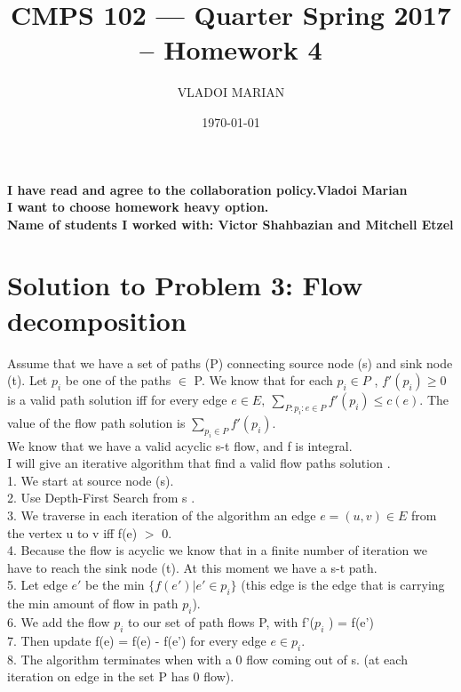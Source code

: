 \documentclass[11 pt]{article}
\title{ CMPS 102 --- Quarter  Spring 2017 --  Homework 4}
\author{VLADOI MARIAN}
\date{\today}
\begin{document}
\maketitle



\begin{center}
{\bf I have read and agree to the collaboration policy.Vladoi Marian}\\
{\bf I want to choose homework heavy option.}\\
{\bf Name of students I worked with: Victor Shahbazian and Mitchell Etzel }
\end{center}


\section*{Solution to Problem 3: Flow decomposition}
Assume that we have a set of paths (P)  connecting source node (s) and sink node (t). Let  $p_i$ be one of the paths $\in$ P. We know that for each $p_i \in P$ , $f'(p_i) \geq 0 $ is a valid path solution iff for every edge $e \in E, \ \sum_{P:p_i:e \in P} f'(p_i) \leq c(e). $ The value of the flow path solution is $\sum_{p_i \in P} f'(p_i)$.\\
We know that we have a valid acyclic  s-t flow, and f is integral.\\
I will give an iterative algorithm that find a valid flow paths solution .\\
1. We start at source node (s).\\
2. Use Depth-First Search from s .\\ 
3. We traverse in each iteration of the algorithm an edge $e = (u,v) \in E$ from the vertex u to v iff f(e) $>$ 0. \\
4. Because the flow is acyclic we know that in a finite number of iteration we have to reach the sink node (t). At this moment we have a s-t path. \\
5. Let edge $e'$ be the min $\{ f(e') | e' \in p_i \}$ (this edge is the edge that is carrying the min amount of flow in path  $p_i$).  \\
6. We add the flow $p_i$ to our set of path flows P, with f'($p_i$ ) = f(e')\\
7. Then update f(e) = f(e) - f(e') for every edge $ e \in p_i$.\\
8. The algorithm terminates when with a 0 flow coming out of s. (at each iteration on edge in the set P has 0 flow).\\
\end{document}
